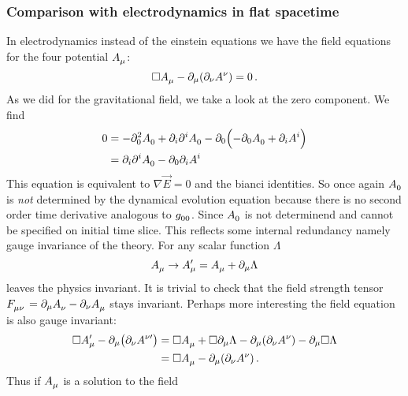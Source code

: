 \subsubsection{Comparison with electrodynamics in flat spacetime}
In electrodynamics instead of the einstein equations we have the field equations
for the four potential $\tensor{A}{_\mu}$:
\begin{equation}
\square\tensor{A}{_\mu}-\partial_\mu\left(\partial_\nu\tensor{A}{^\nu}
\right)=0\,.
\end{equation}
As we did for the gravitational field, we take a look
at the zero component. We find
\begin{equation}
\begin{split}
0&=-\partial_0^2\tensor{A}{_0}+\partial_i\partial^i\tensor{A}{_0}
-\partial_0\left(-\partial_0\tensor{A}{_0}+\partial_iA^i\right)\\
&= \partial_i\partial^i\tensor{A}{_0}-\partial_0\partial_iA^i
\end{split}
\end{equation}
This equation is equivalent to $\nabla\vec{E}=0$ and the bianci identities.
So once again $\tensor{A}{_0}$ is \emph{not} determined by the dynamical
evolution equation because there is no second order time derivative analogous to
$\tensor{g}{_0_0}$. Since $\tensor{A}{_0}$ is not determinend and cannot be
specified on initial time slice. This reflects some internal redundancy namely
gauge invariance of the theory. For any scalar function $\Lambda$
\begin{equation}
\tensor{A}{_\mu}\to\tensor*{A}{*_\mu^\prime}=
\tensor{A}{_\mu}+\partial_\mu\Lambda
\end{equation}
leaves the physics invariant. It is trivial to check that
the field strength tensor $\tensor{F}{_\mu_\nu}=\partial_\mu
\tensor{A}{_\nu}-\partial_\nu\tensor{A}{_\mu}$ stays invariant. Perhaps more
interesting the field equation is also gauge invariant:
\begin{equation}
\begin{split}
\square\tensor*{A}{*_\mu^\prime}-\partial_\mu\left(\partial_\nu\tensor*{A}{*^\nu^\prime}
\right)
&=
\square\tensor{A}{_\mu}+\square\partial_\mu\Lambda-\partial_\mu\left(\partial_\nu\tensor{A}{^\nu}
\right)-\partial_\mu\square\Lambda\\
&=
\square\tensor{A}{_\mu}-\partial_\mu\left(\partial_\nu\tensor{A}{^\nu}
\right)\,.
\end{split}
\end{equation}
Thus if $\tensor{A}{_\mu}$ is a solution to the field
